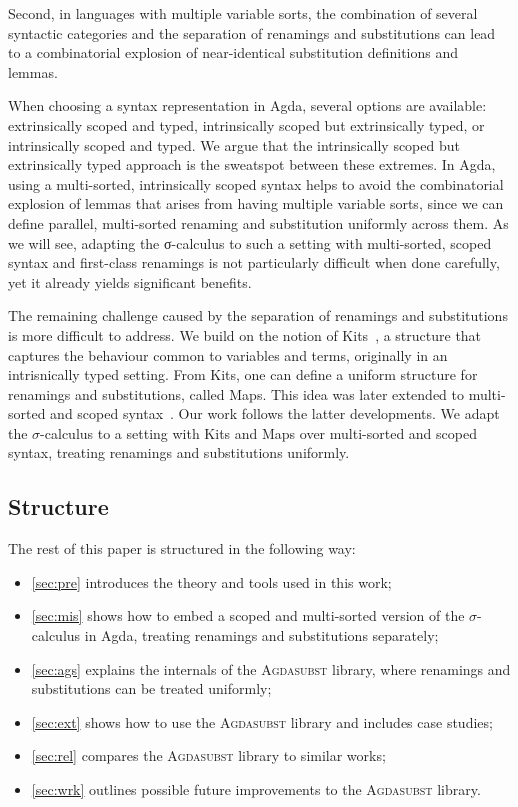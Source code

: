 \documentclass[screen,nonacm]{acmart}
\begin{document}
Second, in languages with multiple variable sorts, the combination of several
syntactic categories and the separation of renamings and substitutions can lead
to a combinatorial explosion of near-identical substitution definitions and
lemmas.

When choosing a syntax representation in Agda, several options are available:
extrinsically scoped and typed, intrinsically scoped but extrinsically typed,
or intrinsically scoped and typed. We argue that the intrinsically scoped but
extrinsically typed approach is the sweatspot between these extremes. In Agda,
using a multi-sorted, intrinsically scoped syntax helps to avoid the
combinatorial explosion of lemmas that arises from having multiple variable
sorts, since we can define parallel, multi-sorted renaming and substitution
uniformly across them. As we will see, adapting the σ-calculus to such a
setting with multi-sorted, scoped syntax and first-class renamings is not
particularly difficult when done carefully, yet it already yields significant
benefits.

The remaining challenge caused by the separation of renamings and substitutions
is more difficult to address. We build on the notion of Kits~\cite{ren-sub,
      stronglytyped, altenkirch2025substitution}, a structure that captures the
behaviour common to variables and terms, originally in an intrisnically typed
setting. From Kits, one can define a uniform structure for renamings and
substitutions, called Maps. This idea was later extended to multi-sorted and
scoped syntax~\cite{saffrich:LIPIcs.ITP.2024.32}. Our work follows the latter
developments. We adapt the $σ$-calculus to a setting with Kits and Maps over
multi-sorted and scoped syntax, treating renamings and substitutions uniformly.

\subsection*{Structure}
The rest of this paper is structured in the following way:
\begin{itemize}
      \item \cref{sec:pre} introduces the theory and tools used in this work;
      \item \cref{sec:mis} shows how to embed a scoped and multi-sorted version of the $\sigma$-calculus in Agda, treating renamings and substitutions separately;
      \item \cref{sec:ags} explains the internals of the \textsc{Agdasubst} library, where renamings and substitutions can be treated uniformly;
      \item \cref{sec:ext} shows how to use the \textsc{Agdasubst} library and includes case studies;
      \item \cref{sec:rel} compares the \textsc{Agdasubst} library to similar works;
      \item \cref{sec:wrk} outlines possible future improvements to the \textsc{Agdasubst} library.
\end{itemize}
\end{document}
